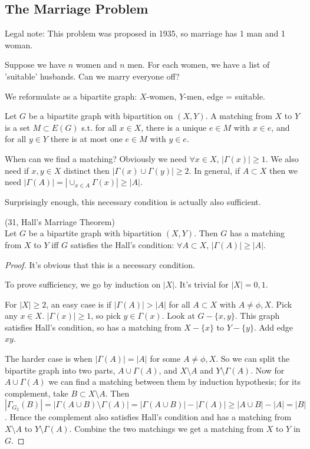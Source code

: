 \documentclass[a4paper]{article}
\begin{document}
\subsection{The Marriage Problem}
Legal note: This problem was proposed in 1935, so marriage has 1 man and 1 woman.

Suppose we have $n$ women and $n$ men. For each women, we have a list of 'suitable' husbands. Can we marry everyone off?

We reformulate as a bipartite graph: $X$-women, $Y$-men, edge = suitable.

\begin{defi}
Let $G$ be a bipartite graph with bipartition on $(X,Y)$. A matching from $X$ to $Y$ is a set $M \subset E(G)$ s.t. for all $x \in X$, there is a unique $e \in M$ with $x \in e$, and for all $y \in Y$ there is at most one $e \in M$ with $y \in e$.
\end{defi}

When can we find a matching? Obviously we need $\forall x \in X$, $|\Gamma(x)| \geq 1$. We also need if $x,y \in X$ distinct then $|\Gamma(x) \cup \Gamma(y)| \geq 2$. In general, if $A \subset X$ then we need $|\Gamma(A)| = |\cup_{x \in A} \Gamma(x)| \geq |A|$.

Surprisingly enough, this necessary condition is actually also sufficient.

\begin{thm} (31, Hall's Marriage Theorem)\\
Let $G$ be a bipartite graph with bipartition $(X,Y)$. Then $G$ has a matching from $X$ to $Y$ iff $G$ satisfies the Hall's condition: $\forall A \subset X$, $|\Gamma(A)| \geq |A|$.
\begin{proof}
It's obvious that this is a necessary condition.

To prove sufficiency, we go by induction on $|X|$. It's trivial for $|X| = 0,1$.

For $|X| \geq 2$, an easy case is if $|\Gamma(A)|> |A|$ for all $A \subset X$ with $A \neq \phi,X$. Pick any $x \in X$. $|\Gamma(x)| \geq 1$, so pick $y \in \Gamma(x)$. Look at $G-\{x,y\}$. This graph satisfies Hall's condition, so has a matching from $X-\{x\}$ to $Y-\{y\}$. Add edge $xy$.

The harder case is when $|\Gamma(A)| = |A|$ for some $A \neq \phi,X$. So we can split the bipartite graph into two parts, $A \cup \Gamma(A)$, and $X\setminus A$ and $Y\setminus \Gamma(A)$. Now for $A \cup \Gamma(A)$ we can find a matching between them by induction hypothesis; for its complement, take $B \subset X\setminus A$. Then $|\Gamma_{G_2}(B)| = |\Gamma(A\cup B)\setminus \Gamma(A)| = |\Gamma(A \cup B)| - |\Gamma(A)| \geq |A \cup B|-|A| = |B|$. Hence the complement also satisfies Hall's condition and has a matching from $X \setminus A$ to $Y \setminus \Gamma(A)$. Combine the two matchings we get a matching from $X$ to $Y$ in $G$.
\end{proof}
\end{thm}
\end{document}
